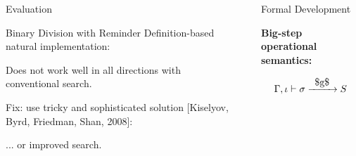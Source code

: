\documentclass[final,20pt]{beamer}
\newcommand{\ocanren}[1]{\mbox{\lstinline|#1|}}
\newcommand{\Xrightarrow}[1]{\xrightarrow{\phantom{x}#1\phantom{x}}}
\begin{document}
\begin{frame}[t]
\begin{columns}[t]
\begin{column}{\onecolwid}
\begin{block}{Evaluation}
      \bigskip
      

      \begin{exampleblock}{Binary Division with Reminder}
        \justifying
        Definition-based natural implementation:


 
        \bigskip
        
        \bigskip

        Does not work well in all directions with conventional search.

        \bigskip

        Fix: use tricky and sophisticated solution [Kiselyov, Byrd, Friedman, Shan, 2008]:
 
        

        ... or improved search.        
      \end{exampleblock}
    \end{block}

  \end{column}

  \begin{column}{\sepwid}\end{column} %

  \begin{column}{\onecolwid} %
  
    \begin{block}{Formal Development}
      \vskip5mm      
      \begin{center} 
         \textbf{Big-step operational semantics:}

	 $$\Gamma, \iota \vdash \sigma \Xrightarrow{\ocanren{$g$}} S$$


\end{center}
\end{block}
\end{column}
\end{columns}
\end{frame}
\end{document}

